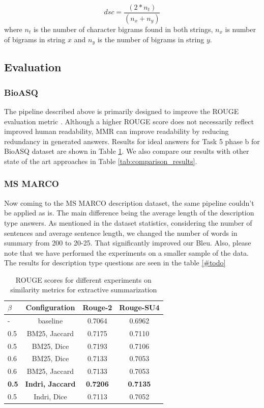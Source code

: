 \begin{equation*}
    dsc = \frac{(2 * n_t)}{ (n_x + n_y)}
\end{equation*}
where $n_t$ is the number of character bigrams found in both strings, $n_x$ is number of bigrams in string $x$ and $n_y$ is the number of bigrams in string $y$.
\subsection{\textbf{Evaluation}}
\subsubsection{BioASQ} 
The pipeline described above is primarily designed to improve the ROUGE evaluation metric \cite{Rougue}. Although a higher ROUGE score does not necessarily reflect improved human readability, MMR can improve readability by reducing redundancy in generated answers.
Results for ideal answers for Task 5 phase b for BioASQ dataset are shown in Table \ref{tab:rouge_extractive_summarization}. We also compare our results with other state of the art approaches in Table \ref{tab:comparison_results}.
\subsubsection{MS MARCO}
Now coming to the MS MARCO description dataset, the same pipeline couldn't be applied as is. The main difference being the average length of the description type answers. As mentioned in the dataset statistics, considering the number of sentences and average sentence length, we changed the number of words in summary from 200 to 20-25. That significantly improved our Bleu. Also, please note that we have performed the experiments on a smaller sample of the data. The results for description type questions are seen in the table \ref{#todo}

\begin{table}[t!]
    \centering
    \begin{tabular}{|l|c|c|c|}
         \hline
            $\beta$& Configuration & Rouge-2 & Rouge-SU4 \\
        \hline
        \hline
        - & baseline & 0.7064 & 0.6962 \\
        \hline
        0.5 & BM25, Jaccard  & 0.7175 & 0.7110  \\ 
        \hline
        0.5 & BM25, Dice & 0.7193 & 0.7106  \\ 
        \hline
        0.6 & BM25, Dice & 0.7133 & 0.7053  \\ 
        \hline
        0.6 & BM25, Jaccard & 0.7133 & 0.7053  \\
        \hline
        \textbf{0.5} & \textbf{ Indri, Jaccard} & \textbf{0.7206} & \textbf{0.7135}  \\ 
        \hline
         0.5 & Indri, Dice & 0.7113 & 0.7052  \\ 
        \hline
    \end{tabular}
    \caption{ROUGE scores for different experiments on similarity metrics for extractive summarization}
    \label{tab:rouge_extractive_summarization}
\end{table}